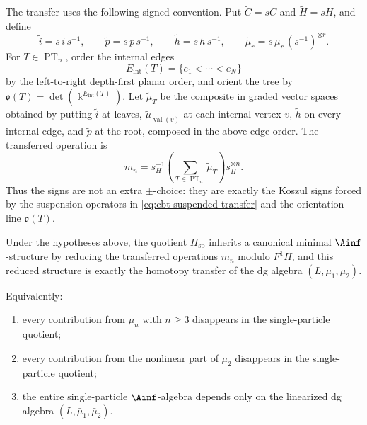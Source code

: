 The transfer uses the following signed convention.  Put
\(\widetilde C=sC\) and \(\widetilde H=sH\), and define
\[
\widetilde i=s\,i\,s^{-1},\qquad
\widetilde p=s\,p\,s^{-1},\qquad
\widetilde h=s\,h\,s^{-1},\qquad
\widetilde\mu_r=s\,\mu_r\,(s^{-1})^{\otimes r}.
\]
For \(T\in\operatorname{PT}_n\), order the internal edges
\[
E_{\mathrm{int}}(T)=\{e_1<\cdots<e_N\}
\]
by the left-to-right depth-first planar order, and orient the tree by
\(\mathfrak o(T)=\det(\Bbbk^{E_{\mathrm{int}}(T)})\).  Let
\(\widetilde\mu_T\) be the composite in graded vector spaces obtained
by putting \(\widetilde i\) at leaves, \(\widetilde\mu_{\operatorname{val}(v)}\)
at each internal vertex \(v\), \(\widetilde h\) on every internal
edge, and \(\widetilde p\) at the root, composed in the above edge
order.  The transferred operation is
\begin{equation}\label{eq:cbt-suspended-transfer}
 m_n
 =
 s_H^{-1}
 \left(\sum_{T\in\operatorname{PT}_n}\widetilde\mu_T\right)
 s_H^{\otimes n}.
\end{equation}
Thus the signs are not an extra \(\pm\)-choice: they are exactly the
Koszul signs forced by the suspension operators in
\eqref{eq:cbt-suspended-transfer} and the orientation line
\(\mathfrak o(T)\).

\begin{theorem}
\label{thm:cbt-single-particle-transfer}
\ClaimStatusProvedHere
Under the hypotheses above, the quotient $H_{\mathrm{sp}}$ inherits a canonical minimal $\Ainf$-structure by reducing the transferred operations $m_n$ modulo $F^1H$, and this reduced structure is exactly the homotopy transfer of the dg algebra $(L,\bar\mu_1,\bar\mu_2)$.

Equivalently:
\begin{enumerate}[label=\textup{(\alph*)},leftmargin=2em]
\item every contribution from $\mu_n$ with $n\ge 3$ disappears in the single-particle quotient;
\item every contribution from the nonlinear part of $\mu_2$ disappears in the single-particle quotient;
\item the entire single-particle $\Ainf$-algebra depends only on the linearized dg algebra $(L,\bar\mu_1,\bar\mu_2)$.
\end{enumerate}
\end{theorem}

